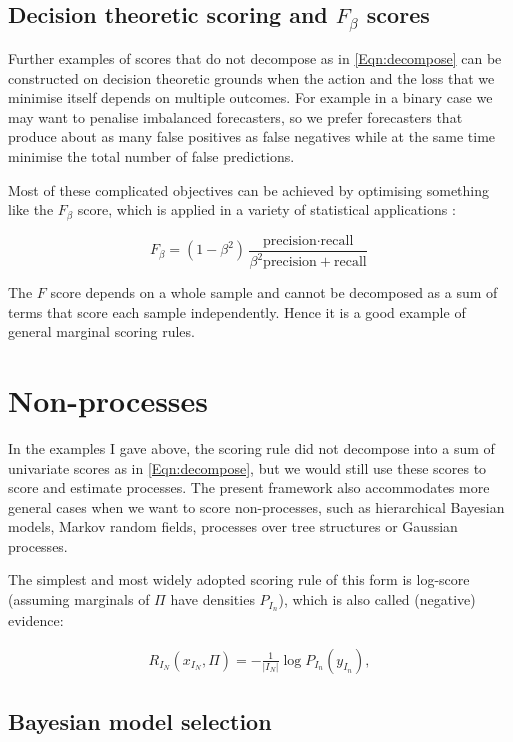 \subsection{Decision theoretic scoring and $F_{\beta}$ scores}

Further examples of scores that do not decompose as in \eqref{Eqn:decompose} can be constructed on decision theoretic grounds when the action and the loss that we minimise itself depends on multiple outcomes. For example in a binary case we may want to penalise imbalanced forecasters, so we prefer forecasters that produce about as many false positives as false negatives while at the same time minimise the total number of false predictions.

Most of these complicated objectives can be achieved by optimising something like the $F_{\beta}$ score, which is applied in a variety of statistical applications \citep{}:

\begin{equation}
	F_\beta = (1-\beta^2)\frac{\mbox{precision}\cdot\mbox{recall}}{\beta^2 \mbox{precision} + \mbox{recall}}
\end{equation}

The $F$ score depends on a whole sample and cannot be decomposed as a sum of terms that score each sample independently. Hence it is a good example of general marginal scoring rules.

\section{Non-\iid processes}

In the examples I gave above, the scoring rule did not decompose into a sum of univariate scores as in \eqref{Eqn:decompose}, but we would still use these scores to score and estimate \iid processes. The present framework also accommodates more general cases when we want to score non-\iid processes, such as hierarchical Bayesian models, Markov random fields, processes over tree structures or Gaussian processes.

The simplest and most widely adopted scoring rule of this form is log-score (assuming marginals of $\Pi$ have densities $P_{I_n}$), which is also called (negative) evidence:

\begin{align}
	R_{I_N}(x_{I_N},\Pi) = - \frac{1}{\vert I_N \vert}\log P_{I_n}(y_{I_n}),
\end{align}

\subsection{Bayesian model selection}

